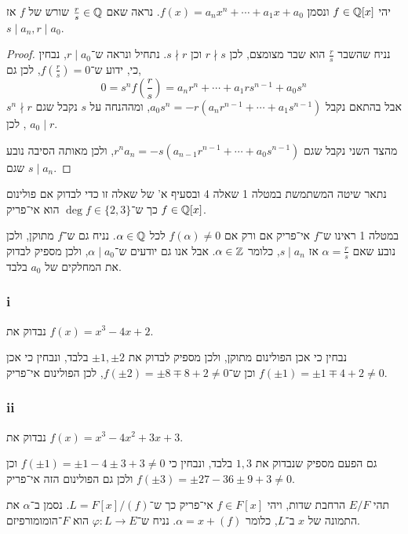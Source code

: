 \question{}
\subquestion{}
יהי $f \in \mathbb{Q}[x]$ ונסמן $f(x) = a_n x^n + \cdots + a_1 x + a_0$.
נראה שאם $\frac{r}{s} \in \mathbb{Q}$ שורש של $f$ אז $s \mid a_n, r \mid a_0$.
\begin{proof}
	נניח שהשבר $\frac{r}{s}$ הוא שבר מצומצם, לכן $r \nmid s$ וכן $s \nmid r$.
	נתחיל ונראה ש־$r \mid a_0$, נבחין כי, ידוע ש־$f(\frac{r}{s}) = 0$, לכן גם,
	\[
		0 = s^n f(\frac{r}{s})
		= a_n r^n + \cdots + a_1 r s^{n - 1} + a_0 s^n
	\]
	אבל בהתאם נקבל $a_0 s^n = -r(a_n r^{n - 1} + \cdots + a_1 s^{n - 1})$, ומההנחה על $s$ נקבל שגם $s^n \nmid r$, לכן $a_0 \mid r$.

	מהצד השני נקבל שגם $r^n a_n = -s (a_{n - 1} r^{n - 1} + \cdots + a_0 s^{n - 1})$, ולכן מאותה הסיבה נובע שגם $s \mid a_n$.
\end{proof}

\subquestion{}
נתאר שיטה המשתמשת במטלה 1 שאלה 4 ובסעיף א' של שאלה זו כדי לבדוק אם פולינום $f \in \mathbb{Q}[x]$ כך ש־$\deg f \in \{2, 3\}$ הוא אי־פריק.
\begin{solution}
	במטלה 1 ראינו ש־$f$ אי־פריק אם ורק אם $f(\alpha) \ne 0$ לכל $\alpha \in \mathbb{Q}$.
	נניח גם ש־$f$ מתוקן, ולכן נובע שאם $\alpha = \frac{r}{s}$ אז $s \mid a_n$, כלומר $\alpha \in \mathbb{Z}$.
	אבל אנו גם יודעים ש־$\alpha \mid a_0$, ולכן מספיק לבדוק את המחלקים של $a_0$ בלבד.
\end{solution}

\subsubsection{i}
נבדוק את $f(x) = x^3 - 4x + 2$.
\begin{solution}
	נבחין כי אכן הפולינום מתוקן, ולכן מספיק לבדוק את $\pm 1, \pm 2$ בלבד, ונבחין כי אכן $f(\pm1) = \pm1 \mp 4 + 2 \ne 0$ וכן ש־$f(\pm2) = \pm 8 \mp 8 + 2 \ne 0$, לכן הפולינום אי־פריק.
\end{solution}

\subsubsection{ii}
נבדוק את $f(x) = x^3 - 4x^2 + 3x + 3$.
\begin{solution}
	גם הפעם מספיק שנבדוק את $1, 3$ בלבד, ונבחין כי $f(\pm1) = \pm 1 - 4 \pm 3 + 3 \ne 0$ וכן $f(\pm3) = \pm 27 - 36 \pm 9 + 3 \ne 0$ ולכן גם הפולינום הזה אי־פריק.
\end{solution}

\question{}
תהי $E / F$ הרחבת שדות, ויהי $f \in F[x]$ אי־פריק כך ש־$L = F[x] / (f)$.
נסמן ב־$\alpha$ את התמונה של $x$ ב־$L$, כלומר $\alpha = x + (f)$.
נניח ש־$\varphi : L \to E$ הוא $F$־הומומורפיזם.

